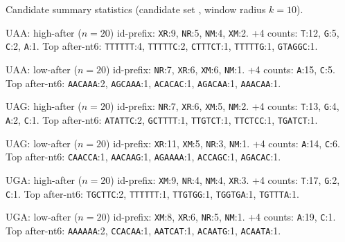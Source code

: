 Candidate summary statistics (candidate set , window radius $k=10$).

UAA: high-after ($n=20$) id-prefix: \texttt{XR}:9, \texttt{NR}:5, \texttt{NM}:4, \texttt{XM}:2. +4 counts: \texttt{T}:12, \texttt{G}:5, \texttt{C}:2, \texttt{A}:1. Top after-nt6: \texttt{TTTTTT}:4, \texttt{TTTTTC}:2, \texttt{CTTTCT}:1, \texttt{TTTTTG}:1, \texttt{GTAGGC}:1.

UAA: low-after ($n=20$) id-prefix: \texttt{NR}:7, \texttt{XR}:6, \texttt{XM}:6, \texttt{NM}:1. +4 counts: \texttt{A}:15, \texttt{C}:5. Top after-nt6: \texttt{AACAAA}:2, \texttt{AGCAAA}:1, \texttt{ACACAC}:1, \texttt{AGACAA}:1, \texttt{AAACAA}:1.

UAG: high-after ($n=20$) id-prefix: \texttt{NR}:7, \texttt{XR}:6, \texttt{XM}:5, \texttt{NM}:2. +4 counts: \texttt{T}:13, \texttt{G}:4, \texttt{A}:2, \texttt{C}:1. Top after-nt6: \texttt{ATATTC}:2, \texttt{GCTTTT}:1, \texttt{TTGTCT}:1, \texttt{TTCTCC}:1, \texttt{TGATCT}:1.

UAG: low-after ($n=20$) id-prefix: \texttt{XR}:11, \texttt{XM}:5, \texttt{NR}:3, \texttt{NM}:1. +4 counts: \texttt{A}:14, \texttt{C}:6. Top after-nt6: \texttt{CAACCA}:1, \texttt{AACAAG}:1, \texttt{AGAAAA}:1, \texttt{ACCAGC}:1, \texttt{AGACAC}:1.

UGA: high-after ($n=20$) id-prefix: \texttt{XM}:9, \texttt{NR}:4, \texttt{NM}:4, \texttt{XR}:3. +4 counts: \texttt{T}:17, \texttt{G}:2, \texttt{C}:1. Top after-nt6: \texttt{TGCTTC}:2, \texttt{TTTTTT}:1, \texttt{TTGTGG}:1, \texttt{TGGTGA}:1, \texttt{TGTTTA}:1.

UGA: low-after ($n=20$) id-prefix: \texttt{XM}:8, \texttt{XR}:6, \texttt{NR}:5, \texttt{NM}:1. +4 counts: \texttt{A}:19, \texttt{C}:1. Top after-nt6: \texttt{AAAAAA}:2, \texttt{CCACAA}:1, \texttt{AATCAT}:1, \texttt{ACAATG}:1, \texttt{ACAATA}:1.
